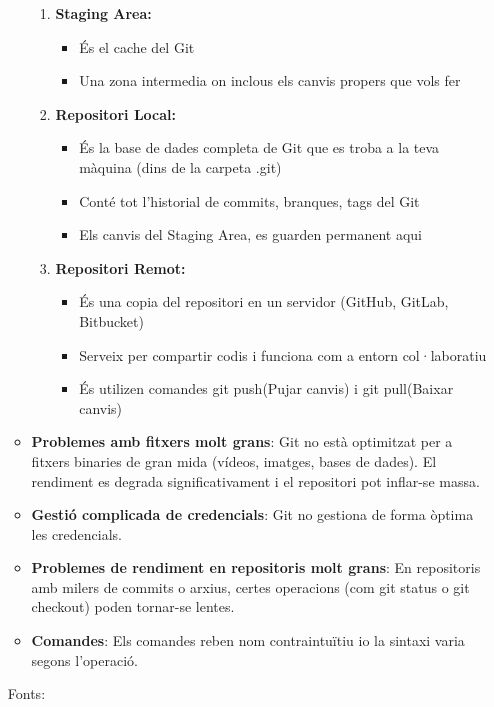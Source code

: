 \begin{enumerate}
\begin{itemize}
\begin{enumerate}
        \item \textbf{Staging Area:}
         \begin{itemize}
            \item És el cache del Git
            \item Una zona intermedia on inclous els canvis propers que vols fer
          \end{itemize}

        \item \textbf{Repositori Local:}
        \begin{itemize}
            \item És la base de dades completa de Git que es troba a la teva màquina (dins de la carpeta .git)
            \item Conté tot l'historial de commits, branques, tags del Git
            \item Els canvis del Staging Area, es guarden permanent aqui
          \end{itemize}
        \item \textbf{Repositori Remot:}
        \begin{itemize}
            \item És una copia del repositori en un servidor (GitHub, GitLab, Bitbucket)
            \item Serveix per compartir codis i funciona com a entorn col·laboratiu
            \item És utilizen comandes git push(Pujar canvis) i git pull(Baixar canvis)
          \end{itemize}
       \end{enumerate}


\item \textbf{Problemes amb fitxers molt grans}: Git no està optimitzat per a fitxers binaries de gran mida (vídeos, imatges, bases de dades). El rendiment es degrada significativament i el repositori pot inflar-se massa.

\item \textbf{Gestió complicada de credencials}: Git no gestiona de forma òptima les credencials.

\item \textbf{Problemes de rendiment en repositoris molt grans}: En repositoris amb milers de commits o arxius, certes operacions (com git status o git checkout) poden tornar-se lentes.

\item \textbf{Comandes}: Els comandes reben nom contraintuïtiu io la sintaxi varia segons l'operació.
\end{itemize}
Fonts:\cite{Comparacionsentrecontroldeversions} \cite{blocdecriticad'undesenvolupador}
\end{enumerate}

